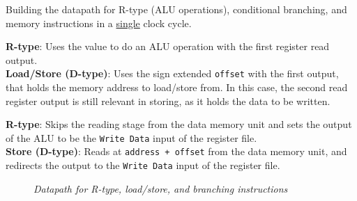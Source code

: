 \documentclass[11pt]{article}
\begin{document}
Building the datapath for R-type (ALU operations), conditional branching, and memory instructions in a \underline{single} clock cycle.

\begin{tcolorbox}[
    enhanced,
    attach boxed title to top left={xshift=6mm,yshift=-1.5mm},
    colback=moonstoneblue!20,
    colframe=moonstoneblue,
    colbacktitle=moonstoneblue,
    title=MUX Controlled by the ALUSrc Signal,
    fonttitle=\bfseries\color{white},
    boxed title style={size=small,colframe=moonstoneblue,sharp corners},
    sharp corners,
    label=box:logic-types,
]
    {\color{moondark}\textbf{R-type}}: Uses the value to do an ALU operation with the first register read output. \\
    {\color{moondark}\textbf{Load/Store (D-type)}}: Uses the sign extended \texttt{offset} with the first output, that holds the memory address to load/store from. In this case, the second read register output is still relevant in storing, as it holds the data to be written.
\end{tcolorbox}

\begin{tcolorbox}[
    enhanced,
    attach boxed title to top left={xshift=6mm,yshift=-1.5mm},
    colback=moonstoneblue!20,
    colframe=moonstoneblue,
    colbacktitle=moonstoneblue,
    title=MUX Controlled by the MemtoReg Signal,
    fonttitle=\bfseries\color{white},
    boxed title style={size=small,colframe=moonstoneblue,sharp corners},
    sharp corners,
    label=box:logic-types,
]
    {\color{moondark}\textbf{R-type}}: Skips the reading stage from the data memory unit and sets the output of the ALU to be the \texttt{Write Data} input of the register file. \\
    {\color{moondark}\textbf{Store (D-type)}}: Reads at \texttt{address + offset} from the data memory unit, and redirects the output to the \texttt{Write Data} input of the register file.
\end{tcolorbox}

\begin{figure}[htbp]
    \centering
    \caption{\textit{Datapath for R-type, load/store, and branching instructions}}
\end{figure}
\end{document}
